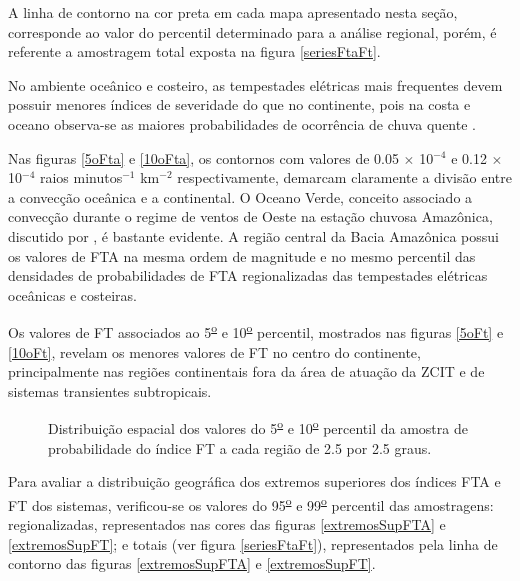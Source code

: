 A linha de contorno na cor preta em cada mapa apresentado nesta seção, corresponde ao valor do percentil determinado para a análise regional, porém, é referente a amostragem total exposta na figura \ref{seriesFtaFt}.

No ambiente oceânico e costeiro, as tempestades elétricas mais frequentes devem possuir menores índices de severidade do que no continente, pois na costa e oceano observa-se as maiores probabilidades de ocorrência de chuva quente \cite{Liu2009}. 

Nas figuras \ref{5oFta} e \ref{10oFta}, os contornos com valores de 0.05 $\times$ 10$^{-4}$ e 0.12 $\times$ 10$^{-4}$ raios minutos$^{-1}$
km$^{-2}$ respectivamente, demarcam claramente a divisão entre a convecção oceânica e a continental. O Oceano Verde, conceito associado a convecção durante o regime de ventos de Oeste na estação chuvosa Amazônica, discutido por , é bastante evidente. A região central da Bacia Amazônica possui os  valores de FTA na mesma ordem de magnitude e no mesmo percentil das densidades de probabilidades de FTA regionalizadas das tempestades elétricas oceânicas e costeiras.

Os valores de FT associados ao 5\textsuperscript{\underline{o}} e 10\textsuperscript{\underline{o}} percentil, mostrados nas figuras \ref{5oFt} e \ref{10oFt}, revelam os menores valores de FT no centro do continente, principalmente nas regiões continentais fora da área de atuação da ZCIT e de sistemas transientes subtropicais.

\begin{figure}[!ht]
  \caption{Distribuição espacial dos valores do 5\textsuperscript{\underline{o}} e 10\textsuperscript{\underline{o}} percentil da amostra de probabilidade do índice FT a cada região de 2.5 por 2.5 graus.}
\label{extremosInfFT}
\end{figure} 

Para avaliar a distribuição geográfica dos extremos superiores dos índices FTA e FT dos sistemas, verificou-se os valores do 95\textsuperscript{\underline{o}} e 99\textsuperscript{\underline{o}} percentil das amostragens: regionalizadas, representados nas cores das figuras \ref{extremosSupFTA} e \ref{extremosSupFT}; e totais (ver figura \ref{seriesFtaFt}), representados pela linha de contorno das figuras \ref{extremosSupFTA} e \ref{extremosSupFT}.


